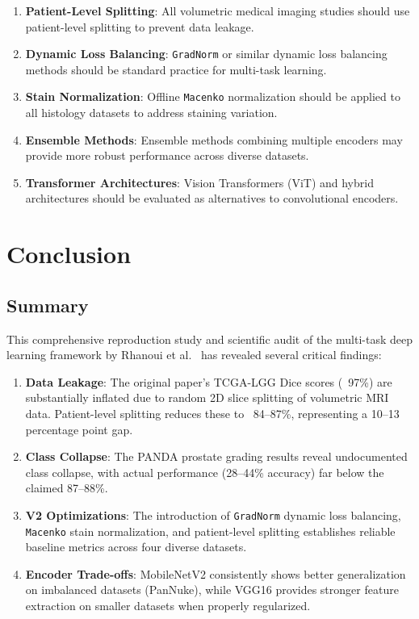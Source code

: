 \documentclass[11pt,a4paper,twoside]{report}
\newcommand{\dataset}[1]{\textsc{#1}}
\newcommand{\model}[1]{\texttt{#1}}
\begin{document}
\begin{enumerate}
    \item \textbf{Patient-Level Splitting}: All volumetric medical imaging studies should use patient-level splitting to prevent data leakage.
    \item \textbf{Dynamic Loss Balancing}: \model{GradNorm} or similar dynamic loss balancing methods should be standard practice for multi-task learning.
    \item \textbf{Stain Normalization}: Offline \model{Macenko} normalization should be applied to all histology datasets to address staining variation.
    \item \textbf{Ensemble Methods}: Ensemble methods combining multiple encoders may provide more robust performance across diverse datasets.
    \item \textbf{Transformer Architectures}: Vision Transformers (ViT) and hybrid architectures should be evaluated as alternatives to convolutional encoders.
\end{enumerate}

\chapter{Conclusion}\label{chap:conclusion}

\section{Summary}

This comprehensive reproduction study and scientific audit of the multi-task deep learning framework by Rhanoui et al.~\cite{ranoui2025multi} has revealed several critical findings:

\begin{enumerate}
    \item \textbf{Data Leakage}: The original paper's \dataset{TCGA}-LGG Dice scores (~97\%) are substantially inflated due to random 2D slice splitting of volumetric MRI data. Patient-level splitting reduces these to ~84--87\%, representing a 10--13 percentage point gap.
    
    \item \textbf{Class Collapse}: The \dataset{PANDA} prostate grading results reveal undocumented class collapse, with actual performance (28--44\% accuracy) far below the claimed 87--88\%.
    
    \item \textbf{V2 Optimizations}: The introduction of \model{GradNorm} dynamic loss balancing, \model{Macenko} stain normalization, and patient-level splitting establishes reliable baseline metrics across four diverse datasets.
    
    \item \textbf{Encoder Trade-offs}: MobileNetV2 consistently shows better generalization on imbalanced datasets (PanNuke), while VGG16 provides stronger feature extraction on smaller datasets when properly regularized.
\end{enumerate}
\end{document}

